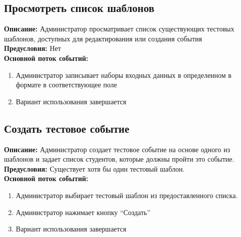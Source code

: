 \documentclass{article}
\begin{document}
    \subsection{Просмотреть список шаблонов}
    \textbf{Описание:} Администратор просматривает список существующих тестовых
    шаблонов, доступных для редактирования или создания события\\
    \textbf{Предусловия:} Нет\\
    \textbf{Основной поток событий:}
    \begin{enumerate}
        \item Администратор записывает наборы входных данных в определенном в формате в соответствующее поле
        \item Вариант использования завершается
    \end{enumerate}

    
    \subsection{Создать тестовое событие}
    \textbf{Описание:} Администратор создает тестовое событие на основе одного
    из шаблонов и задает список студентов, которые должны пройти это событие.\\
    \textbf{Предусловия:} Существует хотя бы один тестовый шаблон.\\
    \textbf{Основной поток событий:}
    \begin{enumerate}
        \item Администратор выбирает тестовый шаблон из предоставленного
        списка.
        \item Администратор нажимает кнопку “Создать”
        \item Вариант использования завершается
    \end{enumerate}


\end{document}
